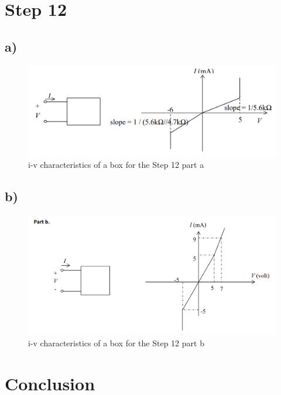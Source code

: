 \documentclass[letterpaper,12pt]{article}
\begin{document}
\section{Step 12}

\subsection{a)}
\begin{figure}[H]
    \centering
   \includegraphics[width=1\textwidth]{12_1.png}
   \caption{i-v characteristics of a box for the Step 12 part a}
\end{figure} 

\subsection{b)}
\begin{figure}[H]
    \centering
   \includegraphics[width=1\textwidth]{12_2.png}
   \caption{i-v characteristics of a box for the Step 12 part b}
\end{figure} 

\section{Conclusion}
\end{document}
